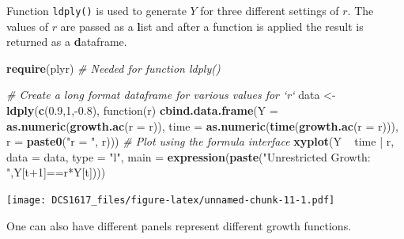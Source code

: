 \documentclass[]{book}
\newenvironment{Shaded}{\begin{snugshade}}{\end{snugshade}}
\newcommand{\KeywordTok}[1]{\textcolor[rgb]{0.13,0.29,0.53}{\textbf{{#1}}}}
\newcommand{\DataTypeTok}[1]{\textcolor[rgb]{0.13,0.29,0.53}{{#1}}}
\newcommand{\DecValTok}[1]{\textcolor[rgb]{0.00,0.00,0.81}{{#1}}}
\newcommand{\FloatTok}[1]{\textcolor[rgb]{0.00,0.00,0.81}{{#1}}}
\newcommand{\StringTok}[1]{\textcolor[rgb]{0.31,0.60,0.02}{{#1}}}
\newcommand{\CommentTok}[1]{\textcolor[rgb]{0.56,0.35,0.01}{\textit{{#1}}}}
\newcommand{\NormalTok}[1]{{#1}}
\begin{document}
Function \texttt{ldply()} is used to generate \(Y\) for three different
settings of \(r\). The values of \(r\) are passed as a \textbf{l}ist and
after a function is applied the result is returned as a
\textbf{d}ataframe.

\begin{Shaded}
\begin{Highlighting}[]
\KeywordTok{require}\NormalTok{(plyr)          }\CommentTok{# Needed for function ldply()}

\CommentTok{# Create a long format dataframe for various values for `r`}
\NormalTok{data <-}\StringTok{ }\KeywordTok{ldply}\NormalTok{(}\KeywordTok{c}\NormalTok{(}\FloatTok{0.9}\NormalTok{,}\DecValTok{1}\NormalTok{,-}\FloatTok{0.8}\NormalTok{), function(r) }\KeywordTok{cbind.data.frame}\NormalTok{(}\DataTypeTok{Y    =} \KeywordTok{as.numeric}\NormalTok{(}\KeywordTok{growth.ac}\NormalTok{(}\DataTypeTok{r =} \NormalTok{r)),}
                                                          \DataTypeTok{time =} \KeywordTok{as.numeric}\NormalTok{(}\KeywordTok{time}\NormalTok{(}\KeywordTok{growth.ac}\NormalTok{(}\DataTypeTok{r =} \NormalTok{r))),}
                                                          \DataTypeTok{r    =} \KeywordTok{paste0}\NormalTok{(}\StringTok{"r = "}\NormalTok{, r)))}
\CommentTok{# Plot using the formula interface}
\KeywordTok{xyplot}\NormalTok{(Y ~}\StringTok{ }\NormalTok{time |}\StringTok{ }\NormalTok{r, }\DataTypeTok{data =} \NormalTok{data, }\DataTypeTok{type =} \StringTok{"l"}\NormalTok{, }\DataTypeTok{main =} \KeywordTok{expression}\NormalTok{(}\KeywordTok{paste}\NormalTok{(}\StringTok{"Unrestricted Growth: "}\NormalTok{,Y[t}\DecValTok{+1}\NormalTok{]==r*Y[t])))}
\end{Highlighting}
\end{Shaded}

\texttt{[image: DCS1617\_files/figure-latex/unnamed-chunk-11-1.pdf]}

One can also have different panels represent different growth functions.
\end{document}
